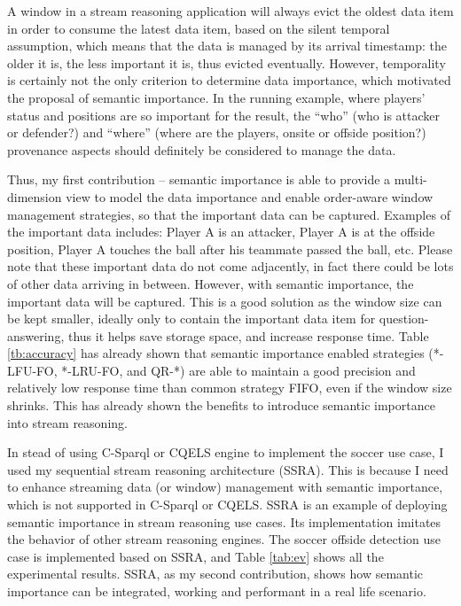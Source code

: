 A window in a stream reasoning application will always evict the oldest data item in order to consume the latest data item, based on the silent temporal assumption, which means that the data is managed by its arrival timestamp: the older it is, the less important it is, thus evicted eventually. 
However, temporality is certainly not the only criterion to determine data importance, which motivated the proposal of semantic importance. 
In the running example, where players' status and positions are so important for the result, the ``who'' (who is attacker or defender?) and ``where'' (where are the players, onsite or offside position?) provenance aspects should definitely be considered to manage the data. 

Thus, my first contribution -- semantic importance is able to provide a multi-dimension view to model the data importance and enable order-aware window management strategies, so that the important data can be captured.
Examples of the important data includes: Player A is an attacker, Player A is at the offside position, Player A touches the ball after his teammate passed the ball, etc. 
Please note that these important data do not come adjacently, in fact there could be lots of other data arriving in between.
However, with semantic importance, the important data will be captured.
This is a good solution as the window size can be kept smaller, ideally only to contain the important data item for question-answering, thus it helps save storage space, and increase response time.
Table \ref{tb:accuracy} has already shown that semantic importance enabled strategies (*-LFU-FO, *-LRU-FO, and QR-*) are able to maintain a good precision and relatively low response time than common strategy FIFO, even if the window size shrinks.
This has already shown the benefits to introduce semantic importance into stream reasoning. 

In stead of using C-Sparql or CQELS engine to implement the soccer use case, I used my sequential stream reasoning architecture (SSRA).
This is because I need to enhance streaming data (or window) management with semantic importance, which is not supported in C-Sparql or CQELS. 
SSRA is an example of deploying semantic importance in stream reasoning use cases. 
Its implementation imitates the behavior of other stream reasoning engines.
The soccer offside detection use case is implemented based on SSRA, and Table \ref{tab:ev} shows all the experimental results.
SSRA, as my second contribution, shows how semantic importance can be integrated, working and performant in a real life scenario. 

